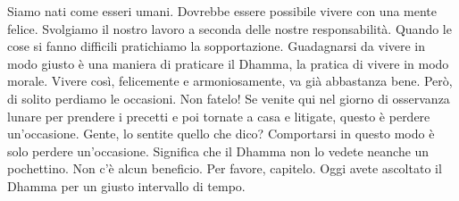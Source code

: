 Siamo nati come esseri umani. Dovrebbe essere possibile vivere con una
mente felice. Svolgiamo il nostro lavoro a seconda delle nostre
responsabilità. Quando le cose si fanno difficili pratichiamo la
sopportazione. Guadagnarsi da vivere in modo giusto è una maniera di
praticare il Dhamma, la pratica di vivere in modo morale. Vivere così,
felicemente e armoniosamente, va già abbastanza bene. Però, di solito
perdiamo le occasioni. Non fatelo! Se venite qui nel giorno di
osservanza lunare per prendere i precetti e poi tornate a casa e
litigate, questo è perdere un'occasione. Gente, lo sentite quello che
dico? Comportarsi in questo modo è solo perdere un'occasione. Significa
che il Dhamma non lo vedete neanche un pochettino. Non c'è alcun
beneficio. Per favore, capitelo. Oggi avete ascoltato il Dhamma per un
giusto intervallo di tempo.

